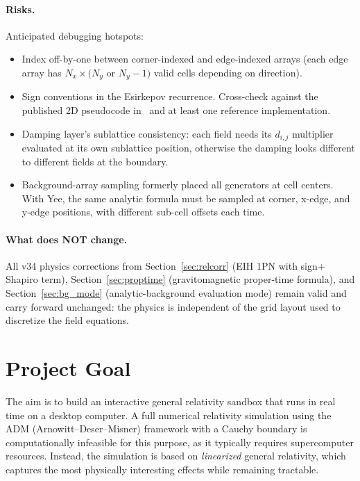 \documentclass[11pt,a4paper]{article}
\begin{document}
\paragraph{Risks.}  Anticipated debugging hotspots:

\begin{itemize}
  \item Index off-by-one between corner-indexed and edge-indexed
        arrays (each edge array has $N_x \times (N_y$ or $N_y-1)$
        valid cells depending on direction).
  \item Sign conventions in the Esirkepov recurrence.  Cross-check
        against the published 2D pseudocode in~\cite{Esirkepov2001}
        and at least one reference implementation.
  \item Damping layer's sublattice consistency: each field needs its
        $d_{i,j}$ multiplier evaluated at its own sublattice
        position, otherwise the damping looks different to different
        fields at the boundary.
  \item Background-array sampling formerly placed all generators at
        cell centers.  With Yee, the same analytic formula must be
        sampled at corner, x-edge, and y-edge positions, with
        different sub-cell offsets each time.
\end{itemize}

\paragraph{What does NOT change.}  All v34 physics corrections from
Section~\ref{sec:relcorr} (EIH 1PN with sign$+$Shapiro term),
Section~\ref{sec:proptime} (gravitomagnetic proper-time formula),
and Section~\ref{sec:bg_mode} (analytic-background evaluation mode)
remain valid and carry forward unchanged: the physics is independent
of the grid layout used to discretize the field equations.

\newpage

\section{Project Goal}

The aim is to build an interactive general relativity sandbox that runs in real time on a desktop computer.  A full numerical relativity simulation using the ADM (Arnowitt--Deser--Misner) framework with a Cauchy boundary is computationally infeasible for this purpose, as it typically requires supercomputer resources.  Instead, the simulation is based on \emph{linearized} general relativity, which captures the most physically interesting effects while remaining tractable.
\end{document}
